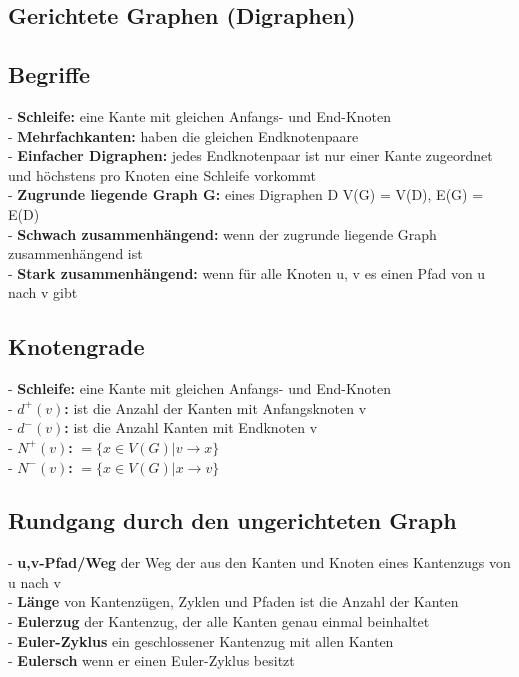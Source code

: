 \documentclass{article}
\begin{document}
\begin{multicols*}{3}
\section{Gerichtete Graphen (Digraphen)}
    \subsection{Begriffe}
        - \textbf{Schleife:} eine Kante mit gleichen Anfangs- und End-Knoten
        \\- \textbf{Mehrfachkanten:}  haben die gleichen Endknotenpaare
        \\- \textbf{Einfacher Digraphen:} jedes Endknotenpaar ist nur einer Kante zugeordnet und höchstens pro Knoten eine Schleife vorkommt
        \\- \textbf{Zugrunde liegende Graph G:} eines Digraphen D V(G) = V(D), E(G) = E(D)
        \\- \textbf{Schwach zusammenhängend:} wenn der zugrunde liegende Graph zusammenhängend ist
        \\- \textbf{Stark zusammenhängend:} wenn für alle Knoten u, v es einen Pfad von u nach v gibt
    \subsection{Knotengrade}
        - \textbf{Schleife:} eine Kante mit gleichen Anfangs- und End-Knoten
        \\- \textbf{$d^+(v)$:} ist die Anzahl der Kanten mit Anfangsknoten v
        \\- \textbf{$d^-(v)$:} ist die Anzahl Kanten mit Endknoten v
        \\- \textbf{$N^+(v)$:} $= \{x \in V(G) | v \rightarrow x\}$
        \\- \textbf{$N^-(v)$:} $= \{x \in V(G) | x \rightarrow v\}$
    \subsection{Rundgang durch den ungerichteten Graph}
        - \textbf{u,v-Pfad/Weg} der Weg der aus den Kanten und Knoten eines Kantenzugs von u nach v 
        \\- \textbf{Länge} von Kantenzügen, Zyklen und Pfaden ist die Anzahl der Kanten
        \\- \textbf{Eulerzug} der Kantenzug, der alle Kanten genau einmal beinhaltet
        \\- \textbf{ Euler-Zyklus} ein geschlossener Kantenzug mit allen Kanten
        \\- \textbf{Eulersch} wenn er einen Euler-Zyklus besitzt

\end{multicols*}
\end{document}
